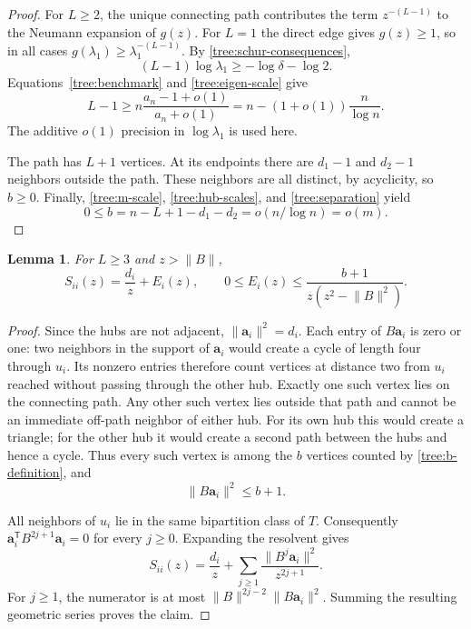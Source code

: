 \documentclass[11pt,a4paper]{article}
\numberwithin{equation}{section}
\newtheorem{lemma}[theorem]{Lemma}
\theoremstyle{definition}
\theoremstyle{remark}
\begin{document}
\begin{proof}
For $L\geq2$, the unique connecting path contributes the term
$z^{-(L-1)}$ to the Neumann expansion of $g(z)$. For $L=1$ the
direct edge gives $g(z)\geq1$, so in all cases
$g(\lambda_1)\geq\lambda_1^{-(L-1)}$. By
\eqref{tree:schur-consequences},
\[
 (L-1)\log\lambda_1\geq-\log\delta-\log2.
\]
Equations~\eqref{tree:benchmark} and \eqref{tree:eigen-scale} give
\[
 L-1\geq n\frac{a_n-1+o(1)}{a_n+o(1)}
 =n-(1+o(1))\frac{n}{\log n}.
\]
The additive $o(1)$ precision in $\log\lambda_1$ is used here.

The path has $L+1$ vertices. At its endpoints there are $d_1-1$
and $d_2-1$ neighbors outside the path. These neighbors are all
distinct, by acyclicity, so $b\geq0$. Finally,
\eqref{tree:m-scale}, \eqref{tree:hub-scales}, and
\eqref{tree:separation} yield
\[
 0\leq b=n-L+1-d_1-d_2=o(n/\log n)=o(m).
\]
\end{proof}

\begin{lemma}\label{tree:diagonal}
For $L\geq3$ and $z>\lVert B\rVert$,
\begin{equation}\label{tree:diagonal-estimate}
 S_{ii}(z)=\frac{d_i}{z}+E_i(z),\qquad
 0\leq E_i(z)\leq\frac{b+1}{z(z^2-\lVert B\rVert^2)}.
\end{equation}
\end{lemma}

\begin{proof}
Since the hubs are not adjacent, $\lVert\mathbf a_i\rVert^2=d_i$.
Each entry of $B\mathbf a_i$ is zero or one: two neighbors in the
support of $\mathbf a_i$ would create a cycle of length four through
$u_i$. Its nonzero entries therefore count vertices at distance two
from $u_i$ reached without passing through the other hub.
Exactly one such vertex lies on the connecting path. Any other such
vertex lies outside that path and cannot be an immediate off-path
neighbor of either hub. For its own hub this would create a triangle;
for the other hub it would create a second path between the hubs and
hence a cycle. Thus every such vertex is among the $b$ vertices
counted by \eqref{tree:b-definition}, and
\begin{equation}\label{tree:second-neighborhood}
 \lVert B\mathbf a_i\rVert^2\leq b+1.
\end{equation}

All neighbors of $u_i$ lie in the same bipartition class of $T$.
Consequently $\mathbf a_i^{\mathsf T}B^{2j+1}\mathbf a_i=0$ for
every $j\geq0$. Expanding the resolvent gives
\[
 S_{ii}(z)=\frac{d_i}{z}
 +\sum_{j\geq1}\frac{\lVert B^j\mathbf a_i\rVert^2}{z^{2j+1}}.
\]
For $j\geq1$, the numerator is at most
$\lVert B\rVert^{2j-2}\lVert B\mathbf a_i\rVert^2$.
Summing the resulting geometric series proves the claim.
\end{proof}
\end{document}
